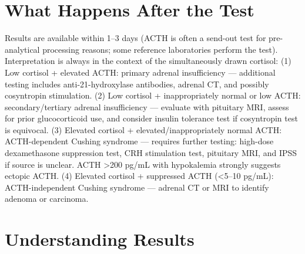 \section*{What Happens After the Test}
Results are available within 1--3 days (ACTH is often a send-out test for pre-analytical processing reasons; some reference laboratories perform the test). Interpretation is always in the context of the simultaneously drawn cortisol: (1) Low cortisol + elevated ACTH: primary adrenal insufficiency --- additional testing includes anti-21-hydroxylase antibodies, adrenal CT, and possibly cosyntropin stimulation. (2) Low cortisol + inappropriately normal or low ACTH: secondary/tertiary adrenal insufficiency --- evaluate with pituitary MRI, assess for prior glucocorticoid use, and consider insulin tolerance test if cosyntropin test is equivocal. (3) Elevated cortisol + elevated/inappropriately normal ACTH: ACTH-dependent Cushing syndrome --- requires further testing: high-dose dexamethasone suppression test, CRH stimulation test, pituitary MRI, and IPSS if source is unclear. ACTH >200 pg/mL with hypokalemia strongly suggests ectopic ACTH. (4) Elevated cortisol + suppressed ACTH (<5--10 pg/mL): ACTH-independent Cushing syndrome --- adrenal CT or MRI to identify adenoma or carcinoma.

\section*{Understanding Results}

